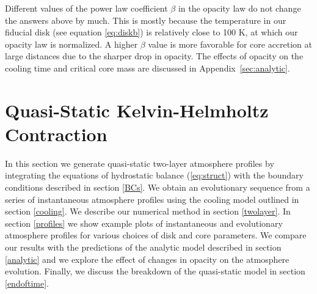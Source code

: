 \documentclass[apj]{emulateapj}
\newcommand{\App}[1]{Appendix~\ref{#1}}
\newcommand{\di}{_{\rm d}}
\newcommand{\cb}{_{\rm RCB}}
\begin{document}

Different values of the power law coefficient $\beta$ in the opacity law do not change the answers above by much.  This is mostly because the temperature in our fiducial disk (see equation \ref{eq:diskb}) is relatively close to 100 K, at which our opacity law is normalized. A higher $\beta$ value is more favorable for core accretion at large distances due to the sharper drop in opacity. The effects of opacity on the cooling time and critical core mass are discussed in \App{sec:analytic}.


%




\section{Quasi-Static Kelvin-Helmholtz Contraction}
\label{KH}

In this section we generate quasi-static two-layer atmosphere profiles by integrating the equations of hydrostatic balance (\ref{eq:struct}) with the boundary conditions described in section \ref{BCs}. We obtain an evolutionary sequence from a series of instantaneous atmosphere profiles using the cooling model outlined in section \ref{cooling}. We describe our numerical method in section \ref{twolayer}. In section \ref{profiles} we show example plots of instantaneous and evolutionary atmosphere profiles for various choices of disk and core parameters. We compare our results with the predictions of the analytic model described in section \ref{analytic} and we explore the effect of changes in opacity on the atmosphere evolution. Finally, we discuss the breakdown of the quasi-static model in section \ref{endoftime}.
\end{document}
